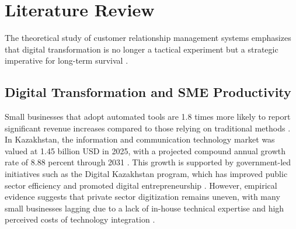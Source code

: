 %
\chapter{Literature Review}
\label{chap:01}
\setlength{\parskip}{1em}
%
The theoretical study of customer relationship management systems emphasizes that digital transformation is no longer a tactical experiment but a strategic imperative for long-term survival \cite{saha2025crm}.
\section{Digital Transformation and SME Productivity}
Small businesses that adopt automated tools are 1.8 times more likely to report significant revenue increases compared to those relying on traditional methods \cite{agbaakin2025leveraging}. In Kazakhstan, the information and communication technology market was valued at 1.45 billion USD in 2025, with a projected compound annual growth rate of 8.88 percent through 2031 \cite{mordor2026ict}. This growth is supported by government-led initiatives such as the Digital Kazakhstan program, which has improved public sector efficiency and promoted digital entrepreneurship \cite{kazbekova2024mechanisms}. However, empirical evidence suggests that private sector digitization remains uneven, with many small businesses lagging due to a lack of in-house technical expertise and high perceived costs of technology integration \cite{kazbekova2024mechanisms}.
%
%
